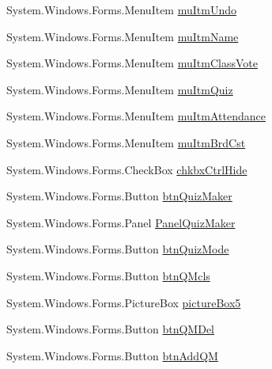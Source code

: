 \begin{DoxyCompactItemize}
\-System.\-Windows.\-Forms.\-Menu\-Item \hyperlink{class_sr_p___classroom_inq_1_1frm_classrrom_inq_aa3e4ca1c9b69ec8008d53de0a7727b9f}{mu\-Itm\-Undo}
\item 
\-System.\-Windows.\-Forms.\-Menu\-Item \hyperlink{class_sr_p___classroom_inq_1_1frm_classrrom_inq_a62421b36b63800d99afde1f0494d3e5f}{mu\-Itm\-Name}
\item 
\-System.\-Windows.\-Forms.\-Menu\-Item \hyperlink{class_sr_p___classroom_inq_1_1frm_classrrom_inq_af00bacaa276c0e6c98e046aa01f73696}{mu\-Itm\-Class\-Vote}
\item 
\-System.\-Windows.\-Forms.\-Menu\-Item \hyperlink{class_sr_p___classroom_inq_1_1frm_classrrom_inq_a081ac032f68b26f56aaf3c859fb5faa3}{mu\-Itm\-Quiz}
\item 
\-System.\-Windows.\-Forms.\-Menu\-Item \hyperlink{class_sr_p___classroom_inq_1_1frm_classrrom_inq_afdc8efd0fa2025280bc6a44b8d71afc2}{mu\-Itm\-Attendance}
\item 
\-System.\-Windows.\-Forms.\-Menu\-Item \hyperlink{class_sr_p___classroom_inq_1_1frm_classrrom_inq_abafec6e5f39b80917c9c53ddd9075e7d}{mu\-Itm\-Brd\-Cst}
\item 
\-System.\-Windows.\-Forms.\-Check\-Box \hyperlink{class_sr_p___classroom_inq_1_1frm_classrrom_inq_a65b5726e5b2299abee70eba1a67b6ea3}{chkbx\-Ctrl\-Hide}
\item 
\-System.\-Windows.\-Forms.\-Button \hyperlink{class_sr_p___classroom_inq_1_1frm_classrrom_inq_a521d725b634462f428d792ca3db59e2e}{btn\-Quiz\-Maker}
\item 
\-System.\-Windows.\-Forms.\-Panel \hyperlink{class_sr_p___classroom_inq_1_1frm_classrrom_inq_a1dd9af4cd0caad174e59e9038dcb8868}{\-Panel\-Quiz\-Maker}
\item 
\-System.\-Windows.\-Forms.\-Button \hyperlink{class_sr_p___classroom_inq_1_1frm_classrrom_inq_aed01a9041d00e0bef6cd7661bc9507d6}{btn\-Quiz\-Mode}
\item 
\-System.\-Windows.\-Forms.\-Button \hyperlink{class_sr_p___classroom_inq_1_1frm_classrrom_inq_a5e5ac9d18be5dce770d85fe95daa6801}{btn\-Q\-Mcls}
\item 
\-System.\-Windows.\-Forms.\-Picture\-Box \hyperlink{class_sr_p___classroom_inq_1_1frm_classrrom_inq_a1b73086b2cde9f44d3e6dfe20e17efbf}{picture\-Box5}
\item 
\-System.\-Windows.\-Forms.\-Button \hyperlink{class_sr_p___classroom_inq_1_1frm_classrrom_inq_a607596e2d684359b9534981170093cce}{btn\-Q\-M\-Del}
\item 
\-System.\-Windows.\-Forms.\-Button \hyperlink{class_sr_p___classroom_inq_1_1frm_classrrom_inq_adda77c1d58e5db64040dff4228e6d97e}{btn\-Add\-Q\-M}

\end{DoxyCompactItemize}

